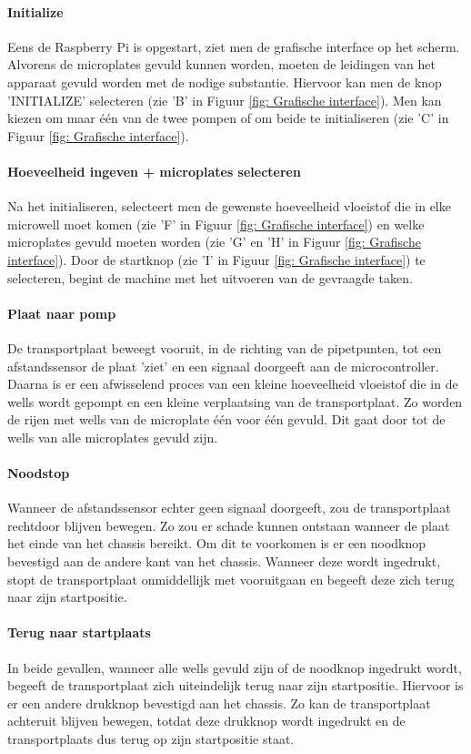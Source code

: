 \documentclass[a4paper,twoside,kulak]{kulakreport} %
\begin{document}
\paragraph{Initialize} 

Eens de Raspberry Pi is opgestart, ziet men de grafische interface op het scherm. Alvorens de microplates gevuld kunnen worden, moeten de leidingen van het apparaat gevuld worden met de nodige substantie. Hiervoor kan men de knop 'INITIALIZE' selecteren (zie 'B' in Figuur \ref{fig: Grafische interface}). Men kan kiezen om maar één van de twee pompen of om beide te initialiseren (zie 'C' in Figuur \ref{fig: Grafische interface}). 
\paragraph{Hoeveelheid ingeven + microplates selecteren}
Na het initialiseren, selecteert men de gewenste hoeveelheid vloeistof die in elke microwell moet komen (zie 'F' in Figuur \ref{fig: Grafische interface}) en welke microplates gevuld moeten worden (zie 'G' en 'H' in Figuur \ref{fig: Grafische interface}). Door de startknop (zie 'I' in Figuur \ref{fig: Grafische interface}) te selecteren, begint de machine met het uitvoeren van de gevraagde taken. 
\paragraph{Plaat naar pomp}
De transportplaat beweegt vooruit, in de richting van de pipetpunten, tot een afstandssensor de plaat 'ziet' en een signaal doorgeeft aan de microcontroller. Daarna is er een afwisselend proces van een kleine hoeveelheid vloeistof die in de wells wordt gepompt en een kleine verplaatsing van de transportplaat. Zo worden de rijen met wells van de microplate één voor één gevuld. Dit gaat door tot de wells van alle microplates gevuld zijn.
\paragraph{Noodstop}
Wanneer de afstandssensor echter geen signaal doorgeeft, zou de transportplaat rechtdoor blijven  bewegen. Zo zou er schade kunnen ontstaan wanneer de plaat het einde van het chassis bereikt. Om dit te voorkomen is er een noodknop bevestigd aan de andere kant van het chassis. Wanneer deze wordt ingedrukt, stopt de transportplaat onmiddellijk met vooruitgaan en begeeft deze zich terug naar  zijn startpositie. 
\paragraph{Terug naar startplaats}
In beide gevallen, wanneer alle wells gevuld zijn of de noodknop ingedrukt wordt, begeeft de transportplaat zich uiteindelijk terug naar zijn startpositie. Hiervoor is er een andere drukknop bevestigd aan het chassis. Zo kan de transportplaat achteruit blijven bewegen, totdat deze drukknop wordt ingedrukt en de transportplaats dus terug op zijn startpositie staat. 
\end{document}
